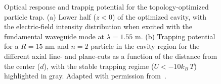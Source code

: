 \begin{figure}[tb]
    \centering
    \caption{Optical response and trappig potential for the topology-optimized particle trap. (a) Lower half ($z<0$) of the optimized cavity, with the electric-field intensity
    distribution when excited with the fundamental waveguide mode at $\lambda=1.55$ \textmu m. (b) Trapping potential for a $R=15$ nm and $n=2$ particle in the cavity region for the different axial line- and plane-cuts as a function
    of the distance from the center ($d$), with the stable trapping regime ($U<-10 k_B\, T$) highlighted in gray. Adapted with permission from~\cite{ownpub1}.}
    \label{fig:MST_dipole}
\end{figure}

